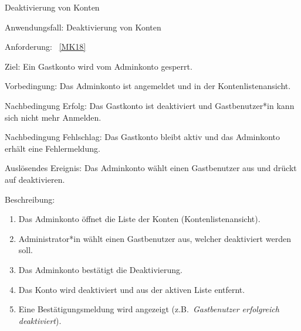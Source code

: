 \begin{function}{60}{Deaktivierung von Konten}
    \item[Anwendungsfall:] Deaktivierung von Konten
    \item[Anforderung:] ~\ref{MK18}
    \item[Ziel:] Ein Gastkonto wird vom Adminkonto gesperrt.
    \item[Vorbedingung:] Das Adminkonto ist angemeldet und in der Kontenlistenansicht.
    \item[Nachbedingung Erfolg:] Das Gastkonto ist deaktiviert und Gastbenutzer*in kann sich nicht mehr Anmelden.
    \item[Nachbedingung Fehlschlag:] Das Gastkonto bleibt aktiv und das Adminkonto erhält eine Fehlermeldung.
    \item[Auslösendes Ereignis:] Das Adminkonto wählt einen Gastbenutzer aus und drückt auf deaktivieren.
    \item[Beschreibung:] ~
    \begin{enumerate}
        \item Das Adminkonto öffnet die Liste der Konten (Kontenlistenansicht).
        \item Administrator*in wählt einen Gastbenutzer aus, welcher deaktiviert werden soll.
        \item Das Adminkonto bestätigt die Deaktivierung.
        \item Das Konto wird deaktiviert und aus der aktiven Liste entfernt.
        \item Eine Bestätigungsmeldung wird angezeigt (z.B.\ \textit{Gastbenutzer erfolgreich deaktiviert}).
    \end{enumerate}
\end{function}

\pagebreak

